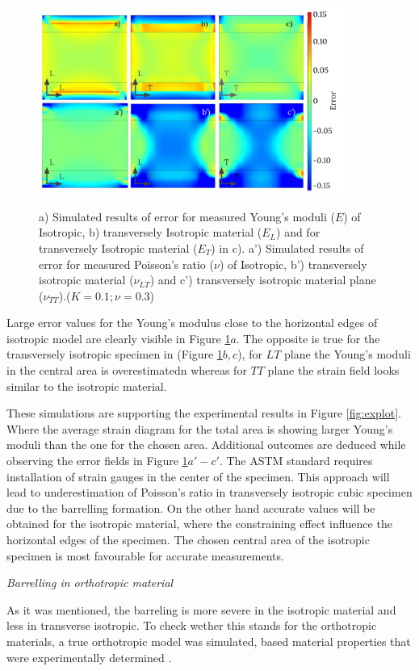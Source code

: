 \documentclass[review]{elsarticle}
\begin{document}
\begin{figure}[h]
\centering
\includegraphics[width=10cm]{BarellingError.pdf}
\label{fig:Error}
\caption{\label{fig:Error} a) Simulated results of error for measured Young's
moduli ($E$) of Isotropic, b) transversely Isotropic material ($E_L$) and for
transversely Isotropic material ($E_T$) in c). 
a') Simulated results of error for measured
Poisson's ratio ($\nu$) of Isotropic, b')
transversely isotropic material ($\nu_{LT}$) and c') transversely isotropic
material plane ($\nu_{TT}$).($K=0.1;\nu=0.3$)}

\end{figure}

Large error values for the Young's
modulus close to the horizontal edges of isotropic model are clearly visible in
Figure \ref{fig:Error}$a$. The opposite is true for the transversely isotropic
specimen in (Figure \ref{fig:Error}$b,c$), for $LT$ plane 
the Young's moduli in the central area is overestimatedn whereas for $TT$ plane
the strain field looks similar to the isotropic material.\par
These simulations are supporting the experimental results in Figure
\ref{fig:explot}. Where the average strain diagram for the total area is showing larger Young's moduli than
the one for the chosen area.
Additional outcomes are deduced  while observing the error fields in Figure
\ref{fig:Error}$a'-c'$. The ASTM standard \cite{american2009standard} requires
installation of strain gauges in the center of the specimen. This approach will
lead to underestimation of Poisson's ratio in transversely isotropic cubic
specimen due to the barrelling formation. On the other hand accurate values will
be obtained for the isotropic material, where the constraining effect influence
the horizontal edges of the specimen. The chosen central area of the isotropic
specimen is most favourable for accurate measurements.


\begin{description}
\item{\textit{Barrelling in orthotropic material}}
\end{description}
As it was mentioned, the barreling is more severe in the isotropic material and
less in transverse isotropic. To check wether this stands for the orthotropic
materials, a true orthotropic model was simulated, based material properties
that were experimentally determined \cite{vorobyevcharacterisation}. \par
\end{document}
